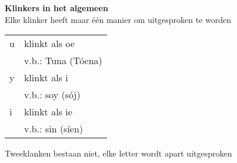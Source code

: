 \begin{song}
\textbf{Klinkers in het algemeen}\\
Elke klinker heeft maar \'e\'en manier om uitgesproken te worden\\
\begin{tabular}{l l}
u & klinkt als oe\\
 & v.b.: Tuna (T\'oena)\\
y & klinkt als i\\
 & v.b.: soy (s\'oj)\\
i & klinkt als ie\\
 & v.b.: sin (s\'ien)\\
\end{tabular}

Tweeklanken bestaan niet, elke letter wordt apart uitgesproken
\end{song}